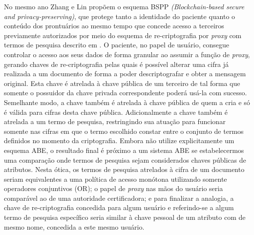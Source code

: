 \documentclass[a4paper,11pt]{article}
\begin{document}
No mesmo ano Zhang e Lin \cite{Zhang2018} propõem o esquema BSPP \emph{(Blockchain-based secure and privacy-preserving)}, que protege tanto a identidade do paciente quanto o conteúdo dos prontuários ao mesmo tempo que concede acesso a terceiros previamente autorizados por meio do esquema de re-criptografia por \emph{proxy} com termos de pesquisa descrito em \cite{Wang2012}.
O paciente, no papel de usuário, consegue controlar o acesso aos seus dados de forma granular ao assumir a função de \emph{proxy}, gerando chaves de re-criptografia pelas quais é possível alterar uma cifra já realizada a um documento de forma a poder descriptografar e obter a mensagem original.
Esta chave é atrelada à chave pública de um terceiro de tal forma que somente o possuidor da chave privada correspondente poderá usá-la com sucesso.
Semelhante modo, a chave também é atrelada à chave pública de quem a cria e só é válida para cifras desta chave pública.
Adicionalmente a chave também é atrelada a um termo de pesquisa, restringindo sua atuação para funcionar somente nas cifras em que o termo escolhido constar entre o conjunto de termos definidos no momento da criptografia.
Embora não utilize explicitamente um esquema ABE, o resultado final é próximo a um sistema ABE se estabelecermos uma comparação onde termos de pesquisa sejam considerados chaves públicas de atributos.
Nesta ótica, os termos de pesquisa atrelados à cifra de um documento seriam equivalentes a uma política de acesso monótona utilizando somente operadores conjuntivos (OR); o papel de \emph{proxy} nas mãos do usuário seria comparável ao de uma autoridade certificadora; e para finalizar a analogia, a chave de re-criptografia concedida para algum usuário e referindo-se a algum termo de pesquisa específico seria similar à chave pessoal de um atributo com de mesmo nome, concedida a este mesmo usuário.
\end{document}
